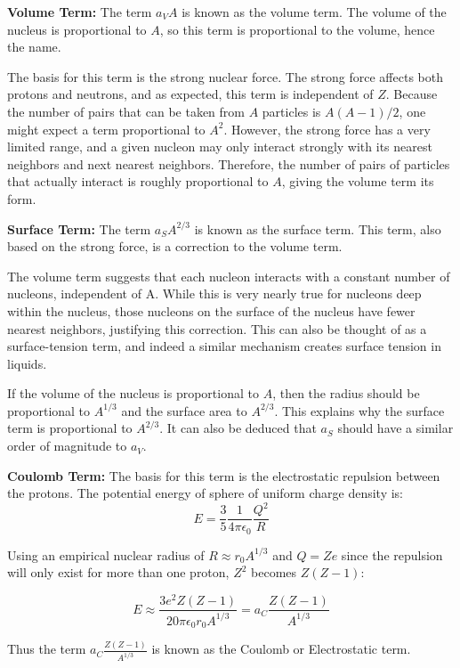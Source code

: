 \documentclass[10pt,a4paper]{article}
\newcommand{\fpe}{4\pi\epsilon_0}
\begin{document}
\textbf{Volume Term:} The term $a_V A$ is known as the volume term. The volume of the nucleus is proportional to $A$, so this term is proportional to the volume, hence the name.

The basis for this term is the strong nuclear force. The strong force affects both protons and neutrons, and as expected, this term is independent of $Z$. Because the number of pairs that can be taken from $A$ particles is $A(A-1)/2$, one might expect a term proportional to $A^2$. However, the strong force has a very limited range, and a given nucleon may only interact strongly with its nearest neighbors and next nearest neighbors. Therefore, the number of pairs of particles that actually interact is roughly proportional to $A$, giving the volume term its form.

\textbf{Surface Term:} The term $a_S A^{2/3}$ is known as the surface term. This term, also based on the strong force, is a correction to the volume term.

The volume term suggests that each nucleon interacts with a constant number of nucleons, independent of A. While this is very nearly true for nucleons deep within the nucleus, those nucleons on the surface of the nucleus have fewer nearest neighbors, justifying this correction. This can also be thought of as a surface-tension term, and indeed a similar mechanism creates surface tension in liquids.

If the volume of the nucleus is proportional to $A$, then the radius should be proportional to $A^{1/3}$ and the surface area to $A^{2/3}$. This explains why the surface term is proportional to $A^{2/3}$. It can also be deduced that $a_S$ should have a similar order of magnitude to $a_V$.

\textbf{Coulomb Term:} The basis for this term is the electrostatic repulsion between the protons. The potential energy of sphere of uniform charge density is:
$$
E = \frac35 \frac{1}{\fpe}\frac{Q^2}{R}
$$

Using an empirical nuclear radius of $R\approx r_0 A^{1/3}$ and $Q=Ze$ since the repulsion will only exist for more than one proton, $Z^2$ becomes $Z(Z-1)$:

\begin{equation}
    E \approx \frac{3e^2Z(Z-1)}{20\pi\epsilon_0r_0 A^{1/3}} = a_C \frac{Z(Z-1)}{A^{1/3}}
\end{equation}

Thus the term $a_C\frac{Z(Z-1)}{A^{1/3}}$ is known as the Coulomb or Electrostatic term.
\newpage
\end{document}
